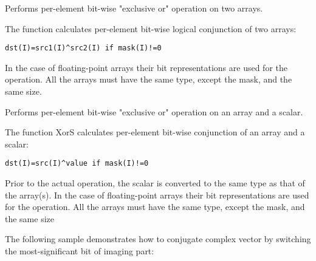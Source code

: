 Performs per-element bit-wise "exclusive or" operation on two arrays.


\begin{description}
\end{description}

The function calculates per-element bit-wise logical conjunction of two arrays:

\begin{lstlisting}
dst(I)=src1(I)^src2(I) if mask(I)!=0
\end{lstlisting}

In the case of floating-point arrays their bit representations are used for the operation. All the arrays must have the same type, except the mask, and the same size.

Performs per-element bit-wise "exclusive or" operation on an array and a scalar.


\begin{description}
\end{description}


The function XorS calculates per-element bit-wise conjunction of an array and a scalar:

\begin{lstlisting}
dst(I)=src(I)^value if mask(I)!=0
\end{lstlisting}

Prior to the actual operation, the scalar is converted to the same type as that of the array(s). In the case of floating-point arrays their bit representations are used for the operation. All the arrays must have the same type, except the mask, and the same size

The following sample demonstrates how to conjugate complex vector by switching the most-significant bit of imaging part:

